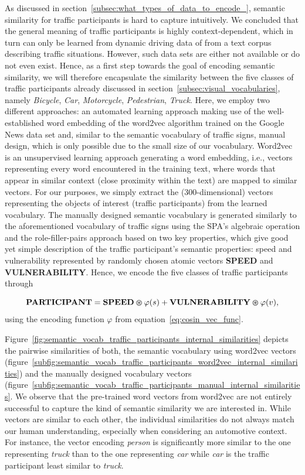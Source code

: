 As discussed in section~\ref{subsec:what_types_of_data_to_encode_}, semantic similarity for traffic participants is hard to capture intuitively.
We concluded that the general meaning of traffic participants is highly context-dependent, which in turn can only be learned from dynamic driving data of from a text corpus describing traffic situations.
However, such data sets are either not available or do not even exist.
Hence, as a first step towards the goal of encoding semantic similarity, we will therefore encapsulate the similarity between the five classes of traffic participants already discussed in section~\ref{subsec:visual_vocabularies}, namely \emph{Bicycle}, \emph{Car}, \emph{Motorcycle}, \emph{Pedestrian}, \emph{Truck}.
Here, we employ two different approaches: an automated learning approach making use of the well-established word embedding of the word2vec algorithm \cite{Mikolov2013} trained on the Google News data set and, similar to the semantic vocabulary of traffic signs, manual design, which is only possible due to the small size of our vocabulary.
Word2vec is an unsupervised learning approach generating a word embedding, i.e., vectors representing every word encountered in the training text, where words that appear in similar context (close proximity within the text) are mapped to similar vectors. 
For our purposes, we simply extract the (\num{300}-dimensional) vectors representing the objects of interest (traffic participants) from the learned vocabulary.
The manually designed semantic vocabulary is generated similarly to the aforementioned vocabulary of traffic signs using the \ac{SPA}'s algebraic operation and the role-filler-pairs approach based on two key properties, which give good yet simple description of the traffic participant's semantic properties: speed and vulnerability represented by randomly chosen atomic vectors \textbf{SPEED} and \textbf{VULNERABILITY}.
Hence, we encode the five classes of traffic participants through

\begin{equation}
\label{eq:semantic_vocab_traffic_participants}
\mathbf{PARTICIPANT} = \mathbf{SPEED} \varoast \varphi(s) + \mathbf{VULNERABILITY} \varoast \varphi(v),
\end{equation}
using the encoding function $\varphi$ from equation~\eqref{eq:cosin_vec_func}.

Figure~\ref{fig:semantic_vocab_traffic_participants_internal_similarities} depicts the pairwise similarities of both, the semantic vocabulary using word2vec vectors (figure~\ref{subfig:semantic_vocab_traffic_participants_word2vec_internal_similarities}) and the manually designed vocabulary vectors (figure~\ref{subfig:semantic_vocab_traffic_participants_manual_internal_similarities}.
We observe that the pre-trained word vectors from word2vec are not entirely successful to capture the kind of semantic similarity we are interested in.
While vectors are similar to each other, the individual similarities do not always match our human understanding, especially when considering an automotive context.
For instance, the vector encoding \emph{person} is significantly more similar to the one representing \emph{truck} than to the one representing \emph{car} while \emph{car} is the traffic participant least similar to \emph{truck}. 

